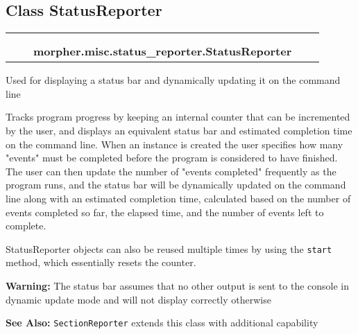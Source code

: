 
\subsection{Class StatusReporter}

    \label{morpher:misc:status_reporter:StatusReporter}
\begin{tabular}{cccccc}
\multicolumn{2}{r}{\settowidth{\BCL}{object}\multirow{2}{\BCL}{object}}
&&
  \\\cline{3-3}
  &&\multicolumn{1}{c|}{}
&&
  \\
&&\multicolumn{2}{l}{\textbf{morpher.misc.status\_reporter.StatusReporter}}
\end{tabular}

Used for displaying a status bar and dynamically updating it on the command
line

Tracks program progress by keeping an internal counter that can be 
incremented by the user, and displays an equivalent status bar and 
estimated completion time on the command line. When an instance is created 
the user specifies how many "events" must be completed before the program 
is considered to have finished. The user can then update the number of 
"events completed" frequently as the program runs, and the status bar will 
be dynamically updated on the command line along with an estimated 
completion time, calculated based on the number of events completed so far,
the elapsed time, and the number of events left to complete.

StatusReporter objects can also be reused multiple times by using the 
\texttt{start} method, which essentially resets the counter.

\textbf{Warning:} The status bar assumes that no other output is sent to the console in 
dynamic update mode and will not display correctly otherwise



\textbf{See Also:} \texttt{SectionReporter} extends this class with additional capability




